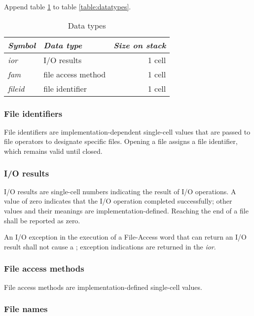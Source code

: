 Append table \ref{file:types} to table \ref{table:datatypes}.

\begin{table}[h]
  \begin{center}
	\caption{Data types}
	\label{file:types}
	\begin{tabular}{llr}
	\hline\hline
	\emph{Symbol} & \emph{Data type} & \emph{Size on stack} \\
	\hline
	\emph{ior}		& I/O results			& 1 cell \\
	\emph{fam}		& file access method	& 1 cell \\
	\emph{fileid}	& file identifier		& 1 cell \\
	\hline\hline
	\end{tabular}
  \end{center}
\end{table}

\subsubsection{File identifiers} %

File identifiers are implementation-dependent single-cell values
that are passed to file operators to designate specific files.
Opening a file assigns a file identifier, which remains valid
until closed.

\subsubsection{I/O results} %
\label{file:ior}

I/O results are single-cell numbers indicating the result of I/O
operations. A value of zero indicates that the I/O operation
completed successfully; other values and their meanings are
implementation-defined. Reaching the end of a file shall be
reported as zero.

An I/O exception in the execution of a File-Access word that can
return an I/O result shall not cause a ;
exception indications are returned in the \emph{ior}.

\subsubsection{File access methods} %

File access methods are implementation-defined single-cell
values.

\subsubsection{File names} %
\label{file:names}

